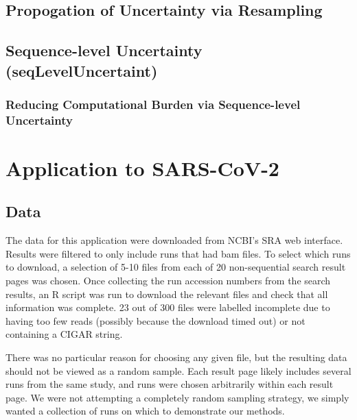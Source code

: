 \documentclass[
]{article}
\begin{document}
\hypertarget{propogation-of-uncertainty-via-resampling}{%
\subsection{Propogation of Uncertainty via
Resampling}\label{propogation-of-uncertainty-via-resampling}}

\hypertarget{sequence-level-uncertainty-seqleveluncertaint}{%
\subsection{Sequence-level Uncertainty
(seqLevelUncertaint)}\label{sequence-level-uncertainty-seqleveluncertaint}}

\hypertarget{reducing-computational-burden-via-sequence-level-uncertainty}{%
\subsubsection{Reducing Computational Burden via Sequence-level
Uncertainty}\label{reducing-computational-burden-via-sequence-level-uncertainty}}

\hypertarget{application-to-sars-cov-2}{%
\section{Application to SARS-CoV-2}\label{application-to-sars-cov-2}}

\hypertarget{data}{%
\subsection{Data}\label{data}}

The data for this application were downloaded from NCBI's SRA web
interface. Results were filtered to only include runs that had bam
files. To select which runs to download, a selection of 5-10 files from
each of 20 non-sequential search result pages was chosen. Once
collecting the run accession numbers from the search results, an R
script was run to download the relevant files and check that all
information was complete. 23 out of 300 files were labelled incomplete
due to having too few reads (possibly because the download timed out) or
not containing a CIGAR string.

There was no particular reason for choosing any given file, but the
resulting data should not be viewed as a random sample. Each result page
likely includes several runs from the same study, and runs were chosen
arbitrarily within each result page. We were not attempting a completely
random sampling strategy, we simply wanted a collection of runs on which
to demonstrate our methods.
\end{document}
